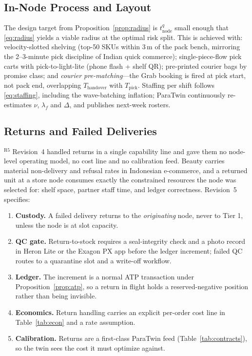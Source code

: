 \subsection{In-Node Process and Layout}
The design target from Proposition~\ref{prop:radius} is $t^{q}_{\mathrm{node}}$ small enough that \eqref{eq:radius} yields a viable radius at the optimal risk split. This is achieved with: velocity-slotted shelving (top-50 SKUs within 3\,m of the pack bench, mirroring the 2--3-minute pick discipline of Indian quick commerce); single-piece-flow pick carts with pick-to-light-lite (phone flash + shelf QR); pre-printed courier bags by promise class; and \emph{courier pre-matching}---the Grab booking is fired at pick start, not pack end, overlapping $T_{\mathrm{handover}}$ with $T_{\mathrm{pick}}$. Staffing per shift follows \eqref{eq:staffing}, including the wave-batching inflation; ParaTwin continuously re-estimates $\nu$, $\lambda_f$ and $\Delta$, and publishes next-week rosters.

\subsection{Returns and Failed Deliveries}\label{sec:returns}
$^{\mathrm{R5}}$ Revision~4 handled returns in a single capability line and gave them no node-level operating model, no cost line and no calibration feed. Beauty carries material non-delivery and refusal rates in Indonesian e-commerce, and a returned unit at a store node consumes exactly the constrained resources the node was selected for: shelf space, partner staff time, and ledger correctness. Revision~5 specifies:

\begin{enumerate}
\item \textbf{Custody.} A failed delivery returns to the \emph{originating} node, never to Tier 1, unless the node is at slot capacity.
\item \textbf{QC gate.} Return-to-stock requires a seal-integrity check and a photo record in Heron Lite or the Exagon PX app before the ledger increment; failed QC routes to a quarantine slot and a write-off workflow.
\item \textbf{Ledger.} The increment is a normal ATP transaction under Proposition~\ref{prop:atp}, so a return in flight holds a reserved-negative position rather than being invisible.
\item \textbf{Economics.} Return handling carries an explicit per-order cost line in Table~\ref{tab:econ} and a rate assumption. 
\item \textbf{Calibration.} Returns are a first-class ParaTwin feed (Table~\ref{tab:contracts}), so the twin sees the cost it must optimize against.
\end{enumerate}

